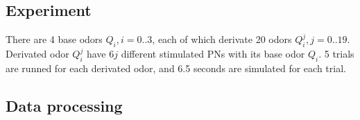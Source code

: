 \documentclass[12pt, a4paper]{article}
\begin{document}


\subsection*{Experiment} \label{Sect:experiment}
There are 4 base odors $Q_i, i=0..3$, each of which derivate 20 odors $Q_i^j, j=0..19$. Derivated odor $Q_i^j$ have $6j$ different stimulated PNs with its base odor $Q_i$. 5 trials are runned for each derivated odor, and 6.5 seconds are simulated for each trial.

\subsection*{Data processing} \label{Sect:data_proc}
 \cdots
\end{document}
